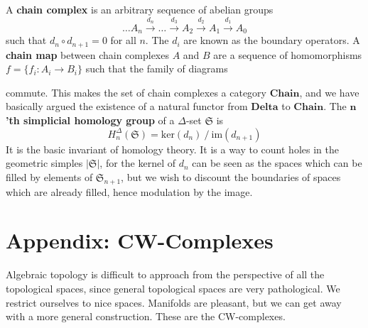 A {\bf chain complex} is an arbitrary sequence of abelian groups
%
\[ \dots A_n \xrightarrow{d_n} \dots \xrightarrow{d_3} A_2 \xrightarrow{d_2} A_1 \xrightarrow{d_1} A_0 \]
%
such that $d_n \circ d_{n+1} = 0$ for all $n$. The $d_i$ are known as the boundary operators. A {\bf chain map} between chain complexes $A$ and $B$ are a sequence of homomorphisms $f = \{ f_i : A_i \to B_i \}$ such that the family of diagrams
%
\begin{center}
\end{center}
%
commute. This makes the set of chain complexes a category $\textbf{Chain}$, and we have basically argued the existence of a natural functor from $\textbf{Delta}$ to $\textbf{Chain}$. The {\bf $\mathbf{n}$'th simplicial homology group} of a $\Delta$-set $\mathfrak{S}$ is
%
\[ H^\Delta_n(\mathfrak{S}) = \text{ker}(d_n)\ /\ \text{im}(d_{n+1}) \]
%
It is the basic invariant of homology theory. It is a way to count holes in the geometric simples $|\mathfrak{S}|$, for the kernel of $d_n$ can be seen as the spaces which can be filled by elements of $\mathfrak{S}_{n+1}$, but we wish to discount the boundaries of spaces which are already filled, hence modulation by the image.










\chapter{Appendix: CW-Complexes}

Algebraic topology is difficult to approach from the perspective of all the topological spaces, since general topological spaces are very pathological. We restrict ourselves to nice spaces. Manifolds are pleasant, but we can get away with a more general construction. These are the CW-complexes.


